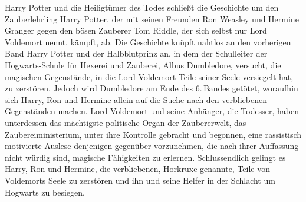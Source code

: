 \glqq Harry Potter und die Heiligtümer des Todes\grqq{} schließt die Geschichte um den Zauberlehrling Harry Potter, der mit seinen Freunden Ron Weasley und Hermine Granger gegen den bösen Zauberer Tom Riddle, der sich selbst nur \glqq Lord Voldemort\grqq{} nennt, kämpft, ab.
Die Geschichte knüpft nahtlos an den vorherigen Band \glqq Harry Potter und der Halbblutprinz\grqq{} an, in dem der Schulleiter der Hogwarts-Schule für Hexerei und Zauberei, Albus Dumbledore, versucht, die magischen Gegenstände, in die Lord Voldemort Teile seiner Seele versiegelt hat, zu zerstören. 
Jedoch wird Dumbledore am Ende des 6.\,Bandes getötet, woraufhin sich Harry, Ron und Hermine allein auf die Suche nach den verbliebenen Gegenständen machen. Lord Voldemort und seine Anhänger, die Todesser, haben unterdessen das mächtigste politische Organ der Zaubererwelt, das Zaubereiministerium, unter ihre Kontrolle gebracht und begonnen, eine rassistisch motivierte \glqq Auslese\grqq{} denjenigen gegenüber vorzunehmen, die nach ihrer Auffassung nicht würdig sind, magische Fähigkeiten zu erlernen. 
Schlussendlich gelingt es Harry, Ron und Hermine, die verbliebenen, Horkruxe genannte, Teile von Voldemorts Seele zu zerstören und ihn und seine Helfer in der \glqq Schlacht um Hogwarts\grqq{} zu besiegen.
